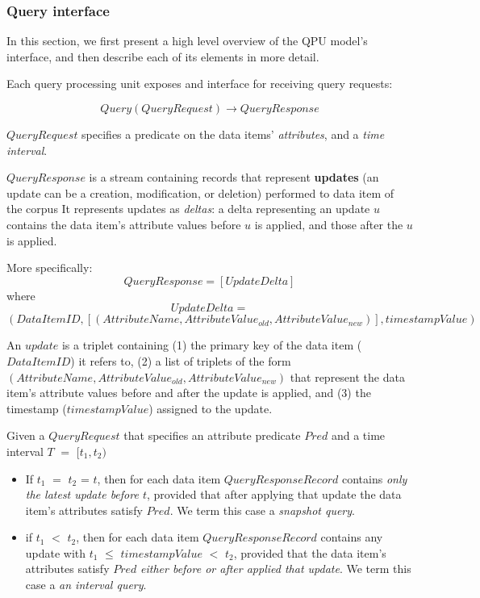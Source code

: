 \subsubsection{Query interface}
\label{ref:query_interface}
In this section, we first present a high level overview of the QPU model's interface,
and then describe each of its elements in more detail.

Each query processing unit exposes and interface for receiving query requests:


\begin{displaymath}
  Query(QueryRequest) \rightarrow QueryResponse
\end{displaymath}

$QueryRequest$ specifies a predicate on the data items' \textit{attributes}, and a \textit{time interval}.

$QueryResponse$ is a stream containing records that represent \textbf{updates} (an update can be a creation, modification, or deletion)
performed to data item of the corpus
It represents updates as \textit{deltas}:
a delta representing an update $u$ contains the data item's attribute values before $u$ is applied,
and those after the $u$ is applied.

More specifically:
\[
  QueryResponse = [UpdateDelta]
\]
where
\[
  UpdateDelta =
\]
\[
  (DataItemID, [(AttributeName, AttributeValue_{old}, AttributeValue_{new})], timestampValue)
\]

An $update$ is a triplet containing
(1) the primary key of the data item ($DataItemID$) it refers to,
(2) a list of triplets of the form $(AttributeName, AttributeValue_{old}, AttributeValue_{new})$ that represent the
data item's attribute values before and after the update is applied,
and (3) the timestamp ($timestampValue$) assigned to the update.

Given a $QueryRequest$ that specifies an attribute predicate $Pred$ and a time interval $T$ $=$ $[t_1, t_2)$
\begin{itemize}

  \item If $t_1$ $=$ $t_2$ = $t$,
  then for each data item $QueryResponseRecord$ contains \textit{only the latest update before $t$},
  provided that after applying that update the data item's attributes satisfy $Pred$.
  We term this case a \textit{snapshot query}.

  \item if $t_1$ $<$ $t_2$,
  then for each data item $QueryResponseRecord$ contains any update with $t_1$ $\leq$ $timestampValue$ $<$ $t_2$,
  provided that the data item's attributes satisfy $Pred$ \textit{either before or after applied that update}.
  We term this case a \textit{an interval query}.

\end{itemize}

